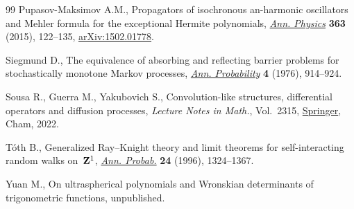 \documentclass[10pt,a4paper]{amsart}
\numberwithin{equation}{section}
\theoremstyle{definition}
\begin{document}
\begin{thebibliography}{99}
Pupasov-Maksimov A.M., Propagators of isochronous an-harmonic oscillators and
 {M}ehler formula for the exceptional {H}ermite polynomials,
 \href{https://doi.org/10.1016/j.aop.2015.09.021}{\textit{Ann. Physics}}
 \textbf{363} (2015), 122--135,
 \href{http://arxiv.org/abs/1502.01778}{arXiv:1502.01778}.

Siegmund D., The equivalence of absorbing and reflecting barrier problems for
 stochastically monotone {M}arkov processes,
 \href{https://doi.org/10.1214/aop/1176995936}{\textit{Ann. Probability}}
 \textbf{4} (1976), 914--924.

Sousa R., Guerra M., Yakubovich S., Convolution-like structures, differential
 operators and diffusion processes, \textit{Lecture Notes in Math.}, Vol.~2315, \href{https://doi.org/10.1007/978-3-031-05296-5}{Springer}, Cham, 2022.

T\'oth B., Generalized {R}ay--{K}night theory and limit theorems for
 self-interacting random walks on~{${\bf Z}^1$},
 \href{https://doi.org/10.1214/aop/1065725184}{\textit{Ann. Probab.}}
 \textbf{24} (1996), 1324--1367.

Yuan M., On ultraspherical polynomials and {W}ronskian determinants of
 trigonometric functions, {u}npublished.

\end{thebibliography}
\end{document}
